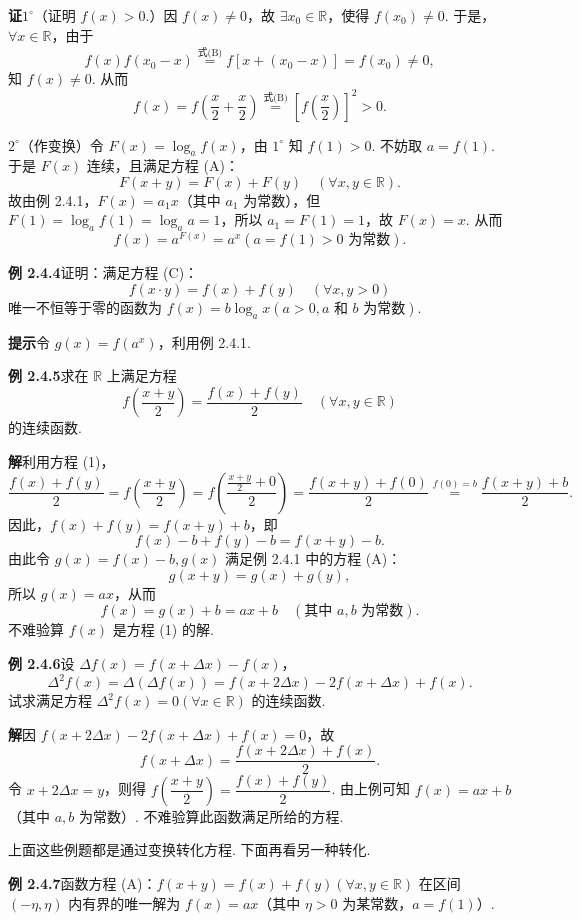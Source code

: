 \documentclass[UTF8, 12pt, fontset=fandol, oneside]{ctexart}
\begin{document}
\noindent\textbf{证}\quad $1^\circ$（证明 $f(x)>0$.）因 $f(x)\ne0$，故 $\exists x_0\in\mathbb{R}$，使得 $f(x_0)\ne0$. 于是，$\forall x\in\mathbb{R}$，由于
\[
  f(x)f(x_0-x)\overset{\text{式(B)}}{=}f[x+(x_0-x)]=f(x_0)\ne0,
\]
知 $f(x)\ne0$. 从而
\[
  f(x)=f\left(\frac x2+\frac x2\right)\overset{\text{式(B)}}{=}\left[f\left(\frac x2\right)\right]^2>0.
\]

$2^\circ$（作变换）令 $F(x)=\log_a f(x)$，由 $1^\circ$ 知 $f(1)>0$. 不妨取 $a=f(1)$. 于是 $F(x)$ 连续，且满足方程 (A)：
\[
  F(x+y)=F(x)+F(y)\quad(\forall x,y\in\mathbb{R}).
\]
故由例 2.4.1，$F(x)=a_1x$（其中 $a_1$ 为常数），但 $F(1)=\log_a f(1)=\log_a a=1$，所以 $a_1=F(1)=1$，故 $F(x)=x$. 从而
\[
  f(x)=a^{F(x)}=a^x(a=f(1)>0\text{ 为常数}).
\]

\noindent\textbf{例 2.4.4}\quad 证明：满足方程 (C)：
\[
  f(x\cdot y)=f(x)+f(y)\quad(\forall x,y>0)
\]
唯一不恒等于零的函数为 $f(x)=b\log_a x(a>0,a\text{ 和 }b\text{ 为常数})$.

\noindent\textbf{提示}\quad 令 $g(x)=f(a^x)$，利用例 2.4.1.

\noindent\textbf{例 2.4.5}\quad 求在 $\mathbb{R}$ 上满足方程
\[
  f\left(\frac{x+y}{2}\right)=\frac{f(x)+f(y)}2\quad(\forall x,y\in\mathbb{R}) \tag{1}
\]
的连续函数.

\noindent\textbf{解}\quad 利用方程 (1)，
\[
  \frac{f(x)+f(y)}2
  =f\left(\frac{x+y}{2}\right)
  =f\left(\frac{\frac{x+y}{2}+0}{2}\right)
  =\frac{f(x+y)+f(0)}2
  \overset{f(0)=b}{=}\frac{f(x+y)+b}2.
\]
因此，$f(x)+f(y)=f(x+y)+b$，即
\[
  f(x)-b+f(y)-b=f(x+y)-b.
\]
由此令 $g(x)=f(x)-b,g(x)$ 满足例 2.4.1 中的方程 (A)：
\[
  g(x+y)=g(x)+g(y),
\]
所以 $g(x)=ax$，从而
\[
  f(x)=g(x)+b=ax+b\quad(\text{其中 }a,b\text{ 为常数}).
\]
不难验算 $f(x)$ 是方程 (1) 的解.

\noindent\textbf{例 2.4.6}\quad 设 $\Delta f(x)=f(x+\Delta x)-f(x)$，
\[
  \Delta^2f(x)=\Delta(\Delta f(x))=f(x+2\Delta x)-2f(x+\Delta x)+f(x).
\]
试求满足方程 $\Delta^2f(x)=0(\forall x\in\mathbb{R})$ 的连续函数.

\noindent\textbf{解}\quad 因 $f(x+2\Delta x)-2f(x+\Delta x)+f(x)=0$，故
\[
  f(x+\Delta x)=\frac{f(x+2\Delta x)+f(x)}2.
\]
令 $x+2\Delta x=y$，则得 $f\left(\dfrac{x+y}{2}\right)=\dfrac{f(x)+f(y)}2$. 由上例可知 $f(x)=ax+b$（其中 $a,b$ 为常数）. 不难验算此函数满足所给的方程.

上面这些例题都是通过变换转化方程. 下面再看另一种转化.

\noindent\textbf{例 2.4.7}\quad 函数方程 (A)：$f(x+y)=f(x)+f(y)(\forall x,y\in\mathbb{R})$ 在区间 $(-\eta,\eta)$ 内有界的唯一解为 $f(x)=ax$（其中 $\eta>0$ 为某常数，$a=f(1)$）.
\end{document}
